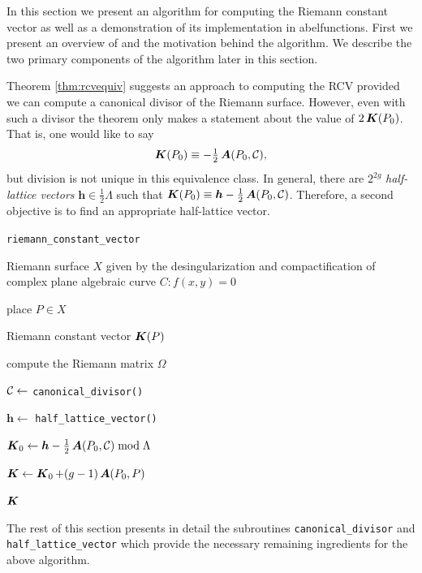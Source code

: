 In this section we present an algorithm for computing the Riemann constant
vector as well as a demonstration of its implementation in {\sc abelfunctions}.
First we present an overview of and the motivation behind the algorithm. We
describe the two primary components of the algorithm later in this section.

Theorem \ref{thm:rcvequiv} suggests an approach to computing the RCV provided we
can compute a canonical divisor of the Riemann surface. However, even with such
a divisor the theorem only makes a statement about the value of $2\operatorname{\boldsymbol{K}}(P_0)$.
That is, one would like to say
\begin{equation}
  \operatorname{\boldsymbol{K}}(P_0) \equiv - \tfrac{1}{2} \operatorname{\boldsymbol{A}}(P_0,\operatorname{\mathcal{C}}),
\end{equation}
but division is not unique in this equivalence class. In general, there are
$2^{2g}$ {\it half-lattice vectors} $\boldsymbol{h} \in \tfrac{1}{2}\Lambda$
such that $\operatorname{\boldsymbol{K}}(P_0) \equiv \boldsymbol{h} - \tfrac{1}{2}\operatorname{\boldsymbol{A}}(P_0,\operatorname{\mathcal{C}})$.
Therefore, a second objective is to find an appropriate half-lattice vector.

\begin{algorithm}[H]
\caption{\tt riemann\_constant\_vector}
\label{alg:rcv}
\begin{algorithmic}[1]
  \Require Riemann surface $X$ given by the desingularization and
  compactification of complex plane algebraic curve $C : f(x,y) = 0$

  \Require place $P \in X$

  \Ensure Riemann constant vector $\operatorname{\boldsymbol{K}}(P)$

  \State compute the Riemann matrix $\Omega$

  \State $\operatorname{\mathcal{C}} \gets$ \verb=canonical_divisor()=

  \State $\boldsymbol{h} \gets$ \verb=half_lattice_vector()=

  \State $\operatorname{\boldsymbol{K}}_0 \gets \boldsymbol{h} - \tfrac{1}{2}\operatorname{\boldsymbol{A}}(P_0,\operatorname{\mathcal{C}})
  \bmod{\Lambda}$

  \State $\operatorname{\boldsymbol{K}} \gets \operatorname{\boldsymbol{K}}_0 + (g-1)\operatorname{\boldsymbol{A}}(P_0,P)$

  \State \Return $\operatorname{\boldsymbol{K}}$
\end{algorithmic}
\end{algorithm}

The rest of this section presents in detail the subroutines
\verb=canonical_divisor= and \verb=half_lattice_vector= which provide the
necessary remaining ingredients for the above algorithm.



